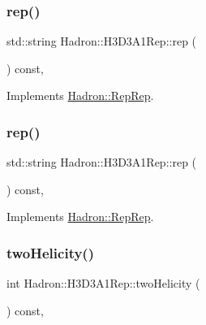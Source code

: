 \subsubsection{\texorpdfstring{rep()}{rep()}\hspace{0.1cm}{\footnotesize\ttfamily [2/3]}}
{\footnotesize\ttfamily std\+::string Hadron\+::\+H3\+D3\+A1\+Rep\+::rep (\begin{DoxyParamCaption}{ }\end{DoxyParamCaption}) const\hspace{0.3cm}{\ttfamily [inline]}, {\ttfamily [virtual]}}



Implements \mbox{\hyperlink{structHadron_1_1RepRep_ab3213025f6de249f7095892109575fde}{Hadron\+::\+Rep\+Rep}}.

\mbox{\label{structHadron_1_1H3D3A1Rep_a79c066008e353585d55f726285ae56cd}} 
\subsubsection{\texorpdfstring{rep()}{rep()}\hspace{0.1cm}{\footnotesize\ttfamily [3/3]}}
{\footnotesize\ttfamily std\+::string Hadron\+::\+H3\+D3\+A1\+Rep\+::rep (\begin{DoxyParamCaption}{ }\end{DoxyParamCaption}) const\hspace{0.3cm}{\ttfamily [inline]}, {\ttfamily [virtual]}}



Implements \mbox{\hyperlink{structHadron_1_1RepRep_ab3213025f6de249f7095892109575fde}{Hadron\+::\+Rep\+Rep}}.

\mbox{\label{structHadron_1_1H3D3A1Rep_a6224faf1aafe58abef4151638b0ccacb}} 
\subsubsection{\texorpdfstring{twoHelicity()}{twoHelicity()}\hspace{0.1cm}{\footnotesize\ttfamily [1/2]}}
{\footnotesize\ttfamily int Hadron\+::\+H3\+D3\+A1\+Rep\+::two\+Helicity (\begin{DoxyParamCaption}{ }\end{DoxyParamCaption}) const\hspace{0.3cm}{\ttfamily [inline]}, {\ttfamily [virtual]}}


